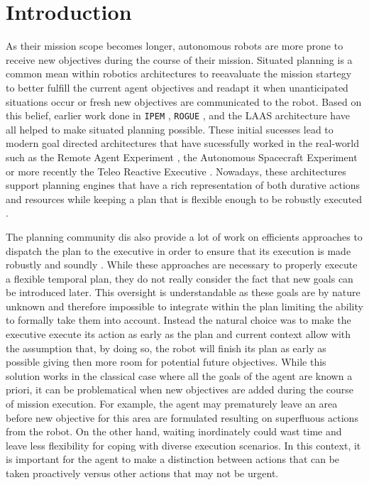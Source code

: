 \section{Introduction}
\label{sec:intro}

As their mission scope becomes longer, autonomous robots are more
prone to receive new objectives during the course of their
mission. Situated planning is a common mean within robotics
architectures to reeavaluate the mission startegy to better fulfill
the current agent objectives and readapt it when unanticipated
situations occur or fresh new objectives are communicated to the
robot. Based on this belief, earlier work done in \texttt{IPEM}
\cite{AmbrosIngerson88}, \texttt{ROGUE} \cite{Haigh98}, and the LAAS
architecture \cite{alami:1998p820} have all helped to make situated
planning possible. These initial sucesses lead to modern goal directed
architectures that have sucessfully worked in the real-world such as
the Remote Agent Experiment \cite{mus98}, the Autonomous Spacecraft
Experiment \cite{chien99} or more recently the Teleo Reactive
Executive \cite{mcgann08b,py10}. Nowadays, these architectures support
planning engines that have a rich representation of both durative
actions and resources while keeping a plan that is flexible enough to
be robustly executed \cite{lemai04}.

The planning community dis also provide a lot of work on efficients
approaches to dispatch the plan to the executive in order to ensure
that its execution is made robustly and soundly
\cite{mus98a,morris01}. While these approaches are necessary to
properly execute a flexible temporal plan, they do not really consider
the fact that new goals can be introduced later. This oversight is
understandable as these goals are by nature unknown and therefore
impossible to integrate within the plan limiting the ability to
formally take them into account. Instead the natural choice was to
make the executive execute its action as early as the plan and current
context allow with the assumption that, by doing so, the robot will
finish its plan as early as possible giving then more room for
potential future objectives.  While this solution works in the
classical case where all the goals of the agent are known a priori, it
can be problematical when new objectives are added during the course
of mission execution. For example, the agent may prematurely leave an
area before new objective for this area are formulated resulting on
superfluous actions from the robot. On the other hand, waiting
inordinately could wast time and leave less flexibility for coping
with diverse execution scenarios. In this context, it is important for
the agent to make a distinction between actions that can be taken
proactively versus other actions that may not be urgent.

